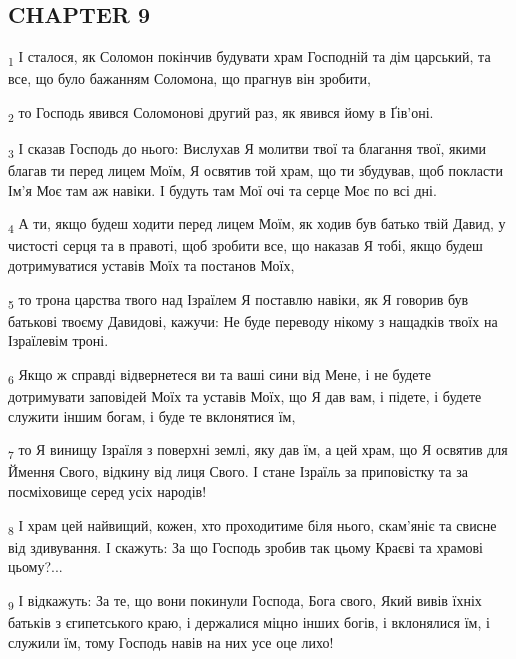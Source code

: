 \subsection{CHAPTER 9}
\begin{tcolorbox}
\textsubscript{1} І сталося, як Соломон покінчив будувати храм Господній та дім царський, та все, що було бажанням Соломона, що прагнув він зробити,
\end{tcolorbox}
\begin{tcolorbox}
\textsubscript{2} то Господь явився Соломонові другий раз, як явився йому в Ґів'оні.
\end{tcolorbox}
\begin{tcolorbox}
\textsubscript{3} І сказав Господь до нього: Вислухав Я молитви твої та благання твої, якими благав ти перед лицем Моїм, Я освятив той храм, що ти збудував, щоб покласти Ім'я Моє там аж навіки. І будуть там Мої очі та серце Моє по всі дні.
\end{tcolorbox}
\begin{tcolorbox}
\textsubscript{4} А ти, якщо будеш ходити перед лицем Моїм, як ходив був батько твій Давид, у чистості серця та в правоті, щоб зробити все, що наказав Я тобі, якщо будеш дотримуватися уставів Моїх та постанов Моїх,
\end{tcolorbox}
\begin{tcolorbox}
\textsubscript{5} то трона царства твого над Ізраїлем Я поставлю навіки, як Я говорив був батькові твоєму Давидові, кажучи: Не буде переводу нікому з нащадків твоїх на Ізраїлевім троні.
\end{tcolorbox}
\begin{tcolorbox}
\textsubscript{6} Якщо ж справді відвернетеся ви та ваші сини від Мене, і не будете дотримувати заповідей Моїх та уставів Моїх, що Я дав вам, і підете, і будете служити іншим богам, і буде те вклонятися їм,
\end{tcolorbox}
\begin{tcolorbox}
\textsubscript{7} то Я винищу Ізраїля з поверхні землі, яку дав їм, а цей храм, що Я освятив для Ймення Свого, відкину від лиця Свого. І стане Ізраїль за приповістку та за посміховище серед усіх народів!
\end{tcolorbox}
\begin{tcolorbox}
\textsubscript{8} І храм цей найвищий, кожен, хто проходитиме біля нього, скам'яніє та свисне від здивування. І скажуть: За що Господь зробив так цьому Краєві та храмові цьому?...
\end{tcolorbox}
\begin{tcolorbox}
\textsubscript{9} І відкажуть: За те, що вони покинули Господа, Бога свого, Який вивів їхніх батьків з єгипетського краю, і держалися міцно інших богів, і вклонялися їм, і служили їм, тому Господь навів на них усе оце лихо!
\end{tcolorbox}
